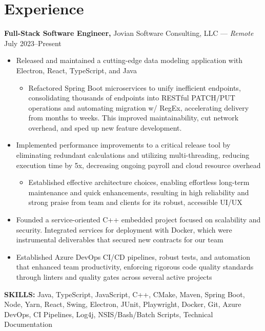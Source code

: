 \documentclass[11pt]{article}       %
\begin{document}
\section*{Experience}
\textbf{Full-Stack Software Engineer,} {Jovian Software Consulting, LLC} --- \textit{Remote} \hfill July 2023--Present \\
\vspace{-9pt}
\begin{itemize}[leftmargin=0.35in]
  \item Released and maintained a cutting-edge data modeling application with Electron, React, TypeScript, and Java
  \vspace{-9pt}
  \begin{itemize}
    \item Refactored Spring Boot microservices to unify inefficient endpoints, consolidating thousands of endpoints into RESTful PATCH/PUT operations and automating migration w/ RegEx, accelerating delivery from months to weeks. This improved maintainability, cut network overhead, and sped up new feature development.
  \end{itemize}
  \vspace{-9pt}
  \item Implemented performance improvements to a critical release tool by eliminating redundant calculations and utilizing multi-threading, reducing execution time by 5x, decreasing ongoing payroll and cloud resource overhead
  \vspace{-9pt}
  \begin{itemize}
    \item Established effective architecture choices, enabling effortless long-term maintenance and quick enhancements, resulting in high reliability and strong praise from team and clients for its robust, accessible UI/UX
  \end{itemize}
  \vspace{-9pt}
  \item Founded a service-oriented C++ embedded project focused on scalability and security. Integrated services for deployment with Docker, which were instrumental deliverables that secured new contracts for our team
  \item Established Azure DevOps CI/CD pipelines, robust tests, and automation that enhanced team productivity, enforcing rigorous code quality standards through linters and quality gates across several active projects
\end{itemize}
\vspace{-9pt}
\textbf{SKILLS:} Java, TypeScript, JavaScript, C++, CMake, Maven, Spring Boot, Node, Yarn, React, Swing, Electron, JUnit, Playwright, Docker, Git, Azure DevOps, CI Pipelines, Log4j, NSIS/Bash/Batch Scripts, Technical Documentation
\vspace{9pt}
\end{document}
